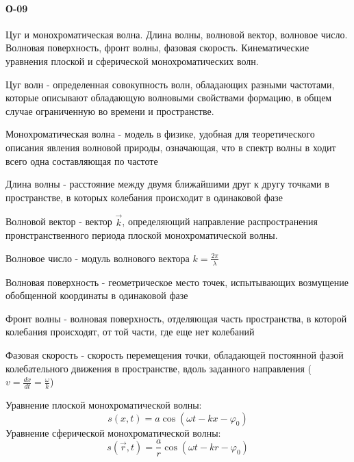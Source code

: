 


\paragraph{О-09}
Цуг и монохроматическая волна. Длина волны, волновой вектор, волновое число. Волновая поверхность, фронт волны, фазовая скорость. Кинематические уравнения плоской и сферической монохроматических волн.

\begin{definition}
Цуг волн - определенная совокупность волн, обладающих разными частотами, которые описывают обладающую волновыми свойствами формацию, в общем случае ограниченную во времени и пространстве.
\end{definition}
\begin{definition}
Монохроматическая волна - модель в физике, удобная для теоретического описания явления волновой природы, означающая, что в спектр волны в ходит всего одна составляющая по частоте 
\end{definition}
\begin{definition}
Длина волны - расстояние между двумя ближайшими друг к другу точками в пространстве, в которых колебания происходит в одинаковой фазе
\end{definition}
\begin{definition}
Волновой вектор - вектор $\vec k$, определяющий направление распространения пронстранственного периода плоской монохроматической волны.
\end{definition}
\begin{definition}
Волновое число - модуль волнового вектора $k = \frac{2\pi}{\lambda}$
\end{definition}
\begin{definition}
Волновая поверхность - геометрическое место точек, испытывающих возмущение обобщенной координаты в одинаковой фазе
\end{definition}
\begin{definition}
Фронт волны - волновая поверхность, отделяющая часть пространства, в которой колебания происходят, от той части, где еще нет колебаний
\end{definition}
\begin{definition}
Фазовая скорость - скорость перемещения точки, обладающей постоянной фазой колебательного движения в пространстве, вдоль заданного направления ($v = \frac{dx}{dt} = \frac{\omega}{k}$)
\end{definition}
Уравнение плоской монохроматической волны:
$$s(x, t) = a\cos(\omega t - kx - \varphi_0)$$
Уравнение сферической монохроматической волны:
$$s(\vec r, t) = \frac{a}{r}\cos(\omega t - kr - \varphi_0)$$

 
